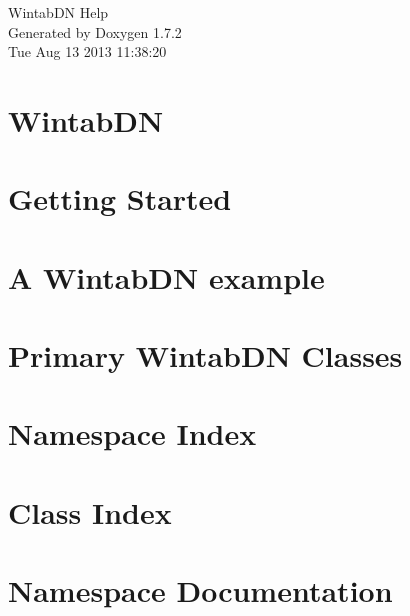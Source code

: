 \documentclass[a4paper]{book}
\begin{document}
\hypersetup{pageanchor=false}
\begin{titlepage}
\vspace*{7cm}
\begin{center}
{\Large WintabDN Help }\\
\vspace*{1cm}
{\large Generated by Doxygen 1.7.2}\\
\vspace*{0.5cm}
{\small Tue Aug 13 2013 11:38:20}\\
\end{center}
\end{titlepage}
\clearemptydoublepage
{}
\tableofcontents
\clearemptydoublepage
{}
\hypersetup{pageanchor=true}
\chapter{WintabDN}
\label{index}\hypertarget{index}{}
\chapter{Getting Started}
\label{page1}
\hypertarget{page1}{}

\chapter{A WintabDN example}
\label{page2}
\hypertarget{page2}{}

\chapter{Primary WintabDN Classes}
\label{page3}
\hypertarget{page3}{}

\chapter{Namespace Index}

\chapter{Class Index}

\chapter{Namespace Documentation}

\end{document}
